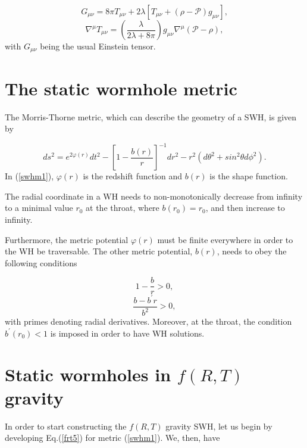 \documentclass[aps,preprint,onecolumn,11pt,showkeys]{revtex4}%
\begin{document}
\begin{equation}
\label{frt5}G_{\mu\nu}=8\pi T_{\mu\nu}+2\lambda[T_{\mu\nu}+(\rho
-\mathcal{P})g_{\mu\nu}],
\end{equation}
\begin{equation}
\label{frt6}\nabla^{\mu}T_{\mu\nu}=\left(  \frac{\lambda}{2\lambda+8\pi
}\right)  g_{\mu\nu}\nabla^{\mu}(\mathcal{P}-\rho),
\end{equation}
with $G_{\mu\nu}$ being the usual Einstein tensor.

\section{The static wormhole metric}

\label{sec:swhm}

The Morris-Thorne metric, which can describe the geometry of a SWH, is given
by \cite{morris/1988}%

\begin{equation}
\label{swhm1}ds^{2}=e^{2\varphi(r)}dt^{2}-\left[1-\frac{b(r)}{r}\right]^{-1}dr^{2}-r^{2}(d\theta^{2}+sin^{2}\theta d\phi^{2}).
\end{equation}
In (\ref{swhm1}), $\varphi(r)$ is the redshift function and $b(r)$ is the
shape function.

The radial coordinate in a WH needs to non-monotonically decrease from
infinity to a minimal value $r_{0}$ at the throat, where $b(r_{0})=r_{0}$, and
then increase to infinity.

Furthermore, the metric potential $\varphi(r)$ must be finite everywhere in
order to the WH be traversable. The other metric potential, $b(r)$, needs to
obey the following conditions \cite{morris/1988}%

\begin{equation}
\label{swhm2}1-\frac{b}{r}>0,
\end{equation}
\begin{equation}
\label{swhm3}\frac{b-b^{\prime}r}{b^{2}}>0,
\end{equation}
with primes denoting radial derivatives. Moreover, at the throat, the
condition $b^{\prime}(r_{0})<1$ is imposed in order to have WH solutions.

\section{Static wormholes in $f(R,T)$ gravity}

\label{sec:swhfrt}

In order to start constructing the $f(R,T)$ gravity SWH, let us begin by
developing Eq.(\ref{frt5}) for metric (\ref{swhm1}). We, then, have%
\end{document}
